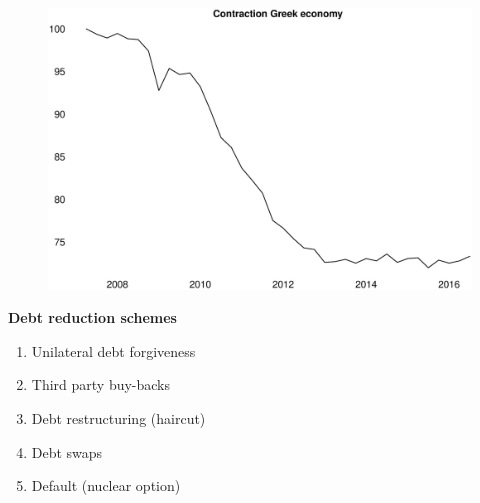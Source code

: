 \documentclass{beamer}
\begin{document}
\begin{frame}
  \begin{figure}
    \includegraphics[scale=.3]{greece2.eps}
  \end{figure}
\end{frame}

\begin{frame}
  \textbf{Debt reduction schemes}
  \begin{enumerate}
    \item Unilateral debt forgiveness
    \item Third party buy-backs
    \item Debt restructuring (haircut)
    \item Debt swaps
    \item Default (nuclear option)
  \end{enumerate}  
\end{frame}
\end{document}
